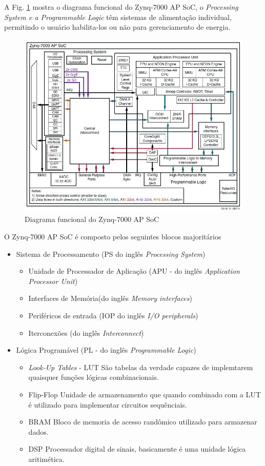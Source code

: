 A Fig. \ref{diaagrama-zynq} mostra o diagrama funcional do Zynq-7000 AP SoC, o \textit{Processing System e a Programmable Logic} têm sistemas de alimentação individual, permitindo o usuário habilita-los ou não para gerenciamento de energia. 
\begin{figure}[h]
	\centering
	\includegraphics[keepaspectratio=true,scale=0.6]{figuras/diagrama-zinq.jpeg}
	\caption{Diagrama funcional do Zynq-7000 AP SoC }
	\label{diaagrama-zynq}
\end{figure}

O Zynq-7000 AP SoC é composto pelos seguintes blocos majoritários
\begin{itemize}
\item Sistema de Processamento (PS do inglês \textit{Processing System})
\begin{itemize}
\item Unidade de Processador de Aplicação (APU - do inglês \textit{Application Processor Unit})
\item  Interfaces de Memória(do inglês \textit{Memory interfaces})
\item  Periféricos de entrada (IOP do inglês \textit{I/O peripherals})
\item Iterconexões (do inglês \textit{Interconnect})
\end{itemize}
\item Lógica Programável (PL - do inglês \textit{Programmable Logic})
\begin{itemize}
	\item \textit{Look-Up Tables} - LUT
	São tabelas da verdade capazes de implemtarem quaisquer funções lógicas combinacionais.
	\item Flip-Flop
	Unidade de armazenamento que quando combinado com a LUT é utilizado para implementar circuitos sequênciais.
	\item BRAM
	Bloco de memoria de acesso randômico utilizado para armazenar dados.
	\item DSP
	Processador digital de sinais, basicamente é uma unidade lógica aritimética.
	 
\end{itemize}
\end{itemize}

